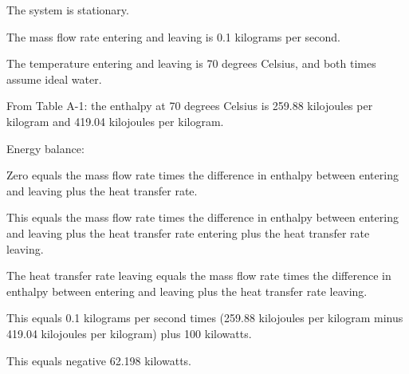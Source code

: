 The system is stationary.

The mass flow rate entering and leaving is 0.1 kilograms per second.

The temperature entering and leaving is 70 degrees Celsius, and both times assume ideal water.

From Table A-1: the enthalpy at 70 degrees Celsius is 259.88 kilojoules per kilogram and 419.04 kilojoules per kilogram.

Energy balance:

Zero equals the mass flow rate times the difference in enthalpy between entering and leaving plus the heat transfer rate.

This equals the mass flow rate times the difference in enthalpy between entering and leaving plus the heat transfer rate entering plus the heat transfer rate leaving.

The heat transfer rate leaving equals the mass flow rate times the difference in enthalpy between entering and leaving plus the heat transfer rate leaving.

This equals 0.1 kilograms per second times (259.88 kilojoules per kilogram minus 419.04 kilojoules per kilogram) plus 100 kilowatts.

This equals negative 62.198 kilowatts.